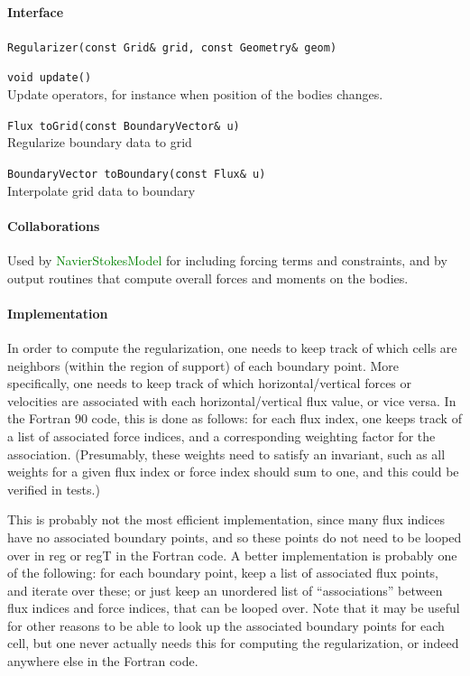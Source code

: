 \documentclass[11pt]{article}
\def\class#1{\textcolor{green}{\ttfamily\small #1}} %
\def\fn#1{{\ttfamily\small #1}} %
\let\code\lstinline
\begin{document}
\paragraph{Interface}
\begin{description}
	\item \code|Regularizer(const Grid& grid, const Geometry& geom)|
	\item \code|void update()|\\
	Update operators, for instance when position of the bodies changes.
	\item \code|Flux toGrid(const BoundaryVector& u)|\\
	Regularize boundary data to grid
	\item \code|BoundaryVector toBoundary(const Flux& u)|\\
	Interpolate grid data to boundary
\end{description}

\paragraph{Collaborations}
Used by \class{NavierStokesModel} for including forcing terms and constraints, and by output routines that compute overall forces and moments on the bodies.

\paragraph{Implementation}
In order to compute the regularization, one needs to keep track of which cells are neighbors (within the region of support) of each boundary point.  More specifically, one needs to keep track of which horizontal/vertical forces or velocities are associated with each horizontal/vertical flux value, or vice versa.  In the Fortran 90 code, this is done as follows: for each flux index, one keeps track of a list of associated force indices, and a corresponding weighting factor for the association.  (Presumably, these weights need to satisfy an invariant, such as all weights for a given flux index or force index should sum to one, and this could be verified in tests.)

This is probably not the most efficient implementation, since many flux indices have no associated boundary points, and so these points do not need to be looped over in \fn{reg} or \fn{regT} in the Fortran code.  A better implementation is probably one of the following: for each boundary point, keep a list of associated flux points, and iterate over these; or just keep an unordered list of ``associations'' between flux indices and force indices, that can be looped over.  Note that it may be useful for other reasons to be able to look up the associated boundary points for each cell, but one never actually needs this for computing the regularization, or indeed anywhere else in the Fortran code.
\end{document}
